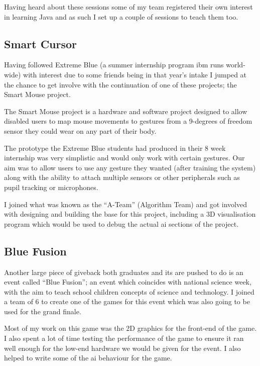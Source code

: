 \documentclass[a4paper,11pt]{report}
\begin{document}
Having heard about these sessions some of my team registered their own interest in learning Java
and as such I set up a couple of sessions to teach them too. \\

\subsection{Smart Cursor}

Having followed Extreme Blue (a summer internship program \gls{ibm} runs world-wide) with interest
due to some friends being in that year's intake I jumped at the chance to get involve with the 
continuation of one of these projects; the Smart Mouse project.

The Smart Mouse project is a hardware and software project designed to allow disabled users to map
mouse movements to gestures from a 9-degrees of freedom sensor they could wear on any part of their
body.

The prototype the Extreme Blue students had produced in their 8 week internship was very simplistic
and would only work with certain gestures. Our aim was to allow users to use any gesture they 
wanted (after training the system) along with the ability to attach multiple sensors or other
peripherals such as pupil tracking or microphones.

I joined what was known as the ``A-Team'' (Algorithm Team) and got involved with designing and 
building the base for this project, including a 3D visualisation program which would be used to 
debug the actual \gls{ai} sections of the project. \\

\subsection{Blue Fusion}

Another large piece of giveback both graduates and \gls{it}s are pushed to do is an event called
``Blue Fusion''; an event which coincides with national science week, with the aim to teach school
children concepts of science and technology. I joined a team of 6 to create one of the games for
this event which was also going to be used for the grand finale.

Most of my work on this game was the 2D graphics for the front-end of the game. I also spent a lot
of time testing the performance of the game to ensure it ran well enough for the low-end hardware
we would be given for the event. I also helped to write some of the \gls{ai} behaviour for the 
game.
\end{document}
